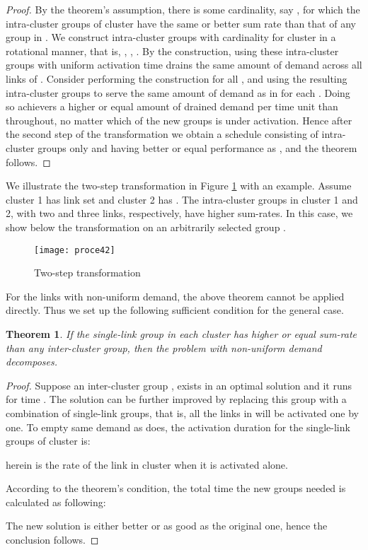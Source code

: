 \documentclass[10pt,onecolumn,journal,draftcls,oneside]{IEEEtran}
\newtheorem{theorem}{Theorem}
\newcounter{cond}
\newcounter{exam}
\begin{document}
\begin{proof}
By the theorem's assumption, there is some cardinality, say ,
for which the intra-cluster groups of cluster  have the same or
better sum rate than that of any group in .  We
construct  intra-cluster groups with cardinality 
for cluster  in a rotational manner, that is, , , .
By the construction, using these  intra-cluster groups with
uniform activation time drains the same amount of demand across
all links of . Consider performing the
construction for all , and using the resulting 
intra-cluster groups to serve the same amount of demand as in  for each . Doing so achievers a higher or equal
amount of drained demand per time unit than 
throughout, no matter which of the new groups is under activation.
Hence after the second step of the transformation we obtain a schedule 
consisting of intra-cluster groups only and having better or equal
performance as , and the theorem follows.
\end{proof}

We illustrate the two-step transformation in Figure \ref {fig:proc} with an example.
Assume cluster 1 has link set  and cluster 2 has . The intra-cluster groups in cluster 1 and 2, with two and three links, respectively, have higher sum-rates. In this case, we show below the transformation on an arbitrarily selected group .

\begin{figure} [ht!]	
\centering
{\texttt{[image: proce42]}}
\vspace{-2mm}
\caption{Two-step transformation}
\label{fig:proc}
\end{figure}

For the links with non-uniform demand, the above theorem cannot be applied directly. Thus we set up the following sufficient condition for the general case.

\begin{theorem}
\label{theo:introclun}
If the single-link group in each cluster has higher or equal sum-rate than any inter-cluster group, then the problem  with non-uniform demand decomposes.
\end{theorem}  

\begin{proof}
Suppose an inter-cluster group , exists in an optimal solution and it runs for time . The solution can be further improved by replacing this group with a combination of single-link groups, that is, all the links in  will be activated one by one. To empty same demand as  does, the activation duration for the single-link groups of cluster  is:

herein  is the rate of the link in cluster  when it is activated alone.

According to the theorem's condition, the total time the new groups needed is calculated as following:


The new solution is either better or as good as the original one, hence the conclusion follows.
\end{proof}
\end{document}
